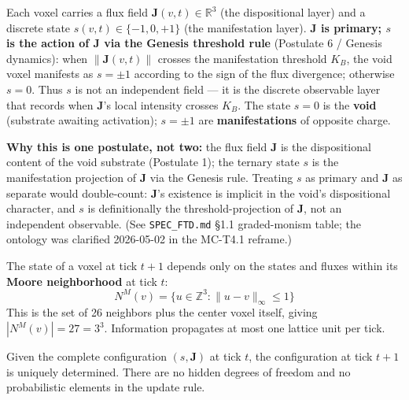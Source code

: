 \documentclass[
  11pt,
  letterpaper,
  twoside,
  openright]{book}
\begin{document}
\begin{ftdaxiom}

Each voxel carries a flux field \(\mathbf{J}(v, t) \in \mathbb{R}^3\)
(the dispositional layer) and a discrete state
\(s(v, t) \in \{-1, 0, +1\}\) (the manifestation layer).
\textbf{\(\mathbf{J}\) is primary; \(s\) is the action of \(\mathbf{J}\)
via the Genesis threshold rule} (Postulate 6 / Genesis dynamics): when
\(\|\mathbf{J}(v, t)\|\) crosses the manifestation threshold \(K_B\),
the void voxel manifests as \(s = \pm 1\) according to the sign of the
flux divergence; otherwise \(s = 0\). Thus \(s\) is not an independent
field --- it is the discrete observable layer that records when
\(\mathbf{J}\)'s local intensity crosses \(K_B\). The state \(s = 0\) is
the \textbf{void} (substrate awaiting activation); \(s = \pm 1\) are
\textbf{manifestations} of opposite charge.

\textbf{Why this is one postulate, not two:} the flux field
\(\mathbf{J}\) is the dispositional content of the void substrate
(Postulate 1); the ternary state \(s\) is the manifestation projection
of \(\mathbf{J}\) via the Genesis rule. Treating \(s\) as primary and
\(\mathbf{J}\) as separate would double-count: \(\mathbf{J}\)'s
existence is implicit in the void's dispositional character, and \(s\)
is definitionally the threshold-projection of \(\mathbf{J}\), not an
independent observable. (See \texttt{SPEC\_FTD.md} §1.1 graded-monism
table; the ontology was clarified 2026-05-02 in the MC-T4.1 reframe.)

\end{ftdaxiom}

\begin{ftdaxiom}

The state of a voxel at tick \(t+1\) depends only on the states and
fluxes within its \textbf{Moore neighborhood} at tick \(t\): \[
N^M(v) = \{ u \in \mathbb{Z}^3 : \|u - v\|_\infty \leq 1 \}
\] This is the set of 26 neighbors plus the center voxel itself, giving
\(|N^M(v)| = 27 = 3^3\). Information propagates at most one lattice unit
per tick.

\end{ftdaxiom}

\begin{ftdaxiom}

Given the complete configuration \((s, \mathbf{J})\) at tick \(t\), the
configuration at tick \(t+1\) is uniquely determined. There are no
hidden degrees of freedom and no probabilistic elements in the update
rule.

\end{ftdaxiom}
\end{document}
